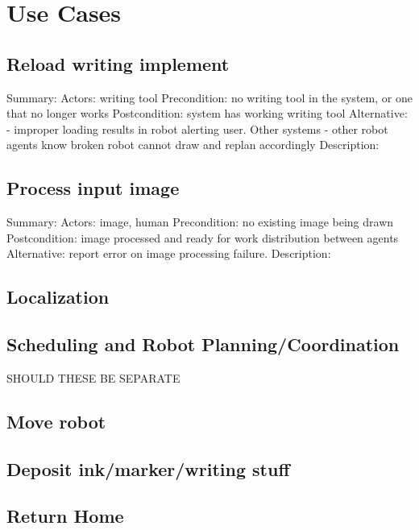 
\section{Use Cases}
\label{sec:use_cases}

\subsection{Reload writing implement}
Summary: 
Actors:  writing tool
Precondition: no writing tool in the system, or one that no longer works
Postcondition: system has working writing tool
Alternative: - improper loading results in robot alerting user. Other systems
             - other robot agents know broken robot cannot draw and replan accordingly
Description:

\subsection{Process input image}
Summary:
Actors: image, human
Precondition:  no existing image being drawn
Postcondition: image processed and ready for work distribution between agents
Alternative: report error on image processing failure.
Description:

\subsection{Localization}

\subsection{Scheduling and Robot Planning/Coordination}
SHOULD THESE BE SEPARATE

\subsection{Move robot}

\subsection{Deposit ink/marker/writing stuff}

\subsection{Return Home}




